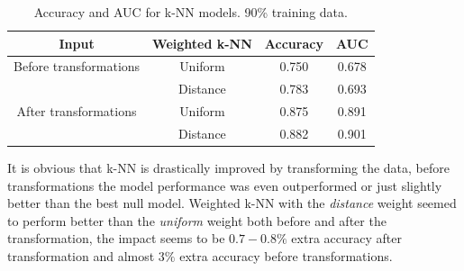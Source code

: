 \documentclass{article}
\begin{document}
\begin{table}[!h]
\centering
\begin{tabular}{cccc}
        Input & Weighted k-NN & Accuracy & AUC \\
		\midrule
		Before transformations & Uniform & 0.750 & 0.678 \\
	    & Distance & 0.783 & 0.693 \\
		\midrule
		After transformations & Uniform & 0.875 & 0.891 \\
		& Distance & 0.882 & 0.901 \\
	\end{tabular}
	\caption{Accuracy and AUC for k-NN models. 90\% training data.}
	\label{tab:k_nn_table_20}
\end{table}

It is obvious that k-NN is drastically improved by transforming the data, before transformations the model performance was even outperformed or just slightly better than the best null model. Weighted k-NN with the \textit{distance} weight seemed to perform better than the \textit{uniform} weight both before and after the transformation, the impact seems to be $0.7-0.8\%$ extra accuracy after transformation and almost $3\%$ extra accuracy before transformations. 
\end{document}
